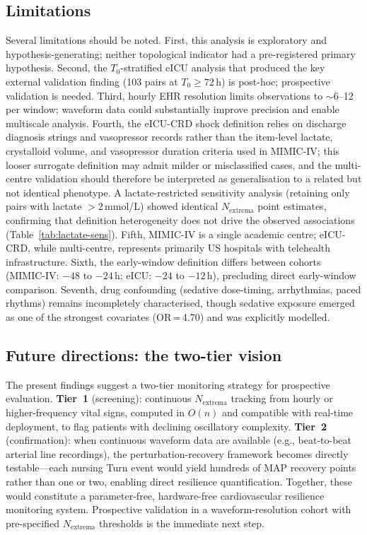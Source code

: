 \documentclass[12pt,a4paper]{article}
\begin{document}
\subsection*{Limitations}

Several limitations should be noted.
First, this analysis is exploratory and hypothesis-generating; neither
topological indicator had a pre-registered primary hypothesis.
Second, the $T_0$-stratified eICU analysis that produced the key external
validation finding (103 pairs at $T_0\geq72$\,h) is post-hoc; prospective
validation is needed.
Third, hourly EHR resolution limits observations to $\sim$6--12 per window;
waveform data could substantially improve precision and enable multiscale
analysis.
Fourth, the eICU-CRD shock definition relies on discharge diagnosis strings
and vasopressor records rather than the item-level lactate, crystalloid
volume, and vasopressor duration criteria used in MIMIC-IV; this looser
surrogate definition may admit milder or misclassified cases, and the
multi-centre validation should therefore be interpreted as generalisation
to a related but not identical phenotype.
A lactate-restricted sensitivity analysis (retaining only pairs with
lactate $>$2\,mmol/L) showed identical $N_{\text{extrema}}$ point estimates,
confirming that definition heterogeneity does not drive the observed
associations (Table~\ref{tab:lactate-sens}).
Fifth, MIMIC-IV is a single academic centre; eICU-CRD, while multi-centre,
represents primarily US hospitals with telehealth infrastructure.
Sixth, the early-window definition differs between cohorts
(MIMIC-IV: $-48$ to $-24$\,h; eICU: $-24$ to $-12$\,h), precluding
direct early-window comparison.
Seventh, drug confounding (sedative dose-timing, arrhythmias, paced rhythms)
remains incompletely characterised, though sedative exposure emerged as one
of the strongest covariates (OR\,=\,4.70) and was explicitly modelled.

\subsection*{Future directions: the two-tier vision}

The present findings suggest a two-tier monitoring strategy for prospective
evaluation.
\textbf{Tier~1} (screening): continuous $N_{\text{extrema}}$ tracking from
hourly or higher-frequency vital signs, computed in $O(n)$ and compatible
with real-time deployment, to flag patients with declining oscillatory
complexity.
\textbf{Tier~2} (confirmation): when continuous waveform data are available
(e.g., beat-to-beat arterial line recordings), the perturbation-recovery
framework becomes directly testable---each nursing Turn event would yield
hundreds of MAP recovery points rather than one or two, enabling direct
resilience quantification.
Together, these would constitute a parameter-free, hardware-free
cardiovascular resilience monitoring system.
Prospective validation in a waveform-resolution cohort with pre-specified
$N_{\text{extrema}}$ thresholds is the immediate next step.
\end{document}
